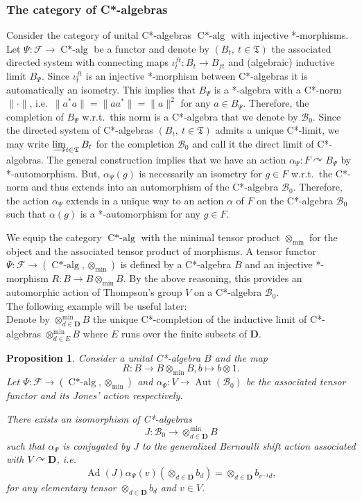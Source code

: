 \documentclass[a4paper,12pt]{amsart}
\numberwithin{equation}{section}
\newtheorem{proposition}[theo]{Proposition}
\theoremstyle{definition}
\newcommand{\act}{\curvearrowright}
\newcommand{\al}{\alpha}
\DeclareMathOperator{\Ad}{Ad}
\DeclareMathOperator{\Aut}{Aut}
\newcommand{\scrB}{\mathscr B}
\DeclareMathOperator{\Calg}{C*-alg}
\newcommand{\D}{\mathbf D}
\newcommand{\cF}{\mathcal F}
\newcommand{\ot}{\otimes}\newcommand{\otmin}{\otimes_{\text{min}}}
\newcommand{\fT}{\mathfrak T}
\begin{document}
\subsubsection{The category of C*-algebras}
Consider the category of unital C*-algebras $\Calg$ with injective *-morphisms.
Let $\Psi:\cF\to \Calg$ be a functor and denote by $(B_t ,\ t\in\fT)$ the associated directed system with connecting maps $\iota_t^{ft}:B_t\to B_{ft}$ and (algebraic) inductive limit $B_\Psi$.
Since $\iota_t^{ft}$ is an injective *-morphism between C*-algebras it is automatically an isometry.
This implies that $B_\Psi$ is a *-algebra with a C*-norm $\| \cdot \|$, i.e.~$\| a^*a \| = \| aa^*\| = \|a\|^2$ for any $a\in B_\Psi$.
Therefore, the completion of $B_\Psi$ w.r.t.~this norm is a C*-algebra that we denote by $\mathscr B_0.$
Since the directed system of C*-algebras $(B_t,\ t\in\fT)$ admits a unique C*-limit, we may write $\varinjlim_{t\in\fT} B_t$ for the completion $\scrB_0$ and call it the direct limit of C*-algebras.
The general construction implies that we have an action $\al_\Psi:F\act B_\Psi$ by *-automorphism.
But, $\al_\Psi(g)$ is necessarily an isometry for $g\in F$ w.r.t.~the C*-norm and thus extends into an automorphism of the C*-algebra $\scrB_0.$
Therefore, the action $\al_\Psi$ extends in a unique way to an action $\al$ of $F$ on the C*-algebra $\mathscr B_0$ such that $\al(g)$ is a *-automorphism for any $g\in F$.

We equip the category $\Calg$ with the minimal tensor product $\ot_{\min}$ for the object and the associated tensor product of morphisms.  
A tensor functor $\Psi:\cF\to (\Calg,\ot_{\min})$ is defined by a C*-algebra $B$ and an injective *-morphism $R: B\to B\ot_{\min} B.$
By the above reasoning, this provides an automorphic action of Thompson's group $V$ on a C*-algebra $\scrB_0.$\\[0.25cm]
The following example will be useful later:\\[0.1cm]
Denote by $\otimes_{d\in\D}^{\min} B$ the unique C*-completion of the inductive limit of C*-algebras $\ot_{d\in E}^{\min} B$ where $E$ runs over the finite subsets of $\D$.

\begin{proposition}\label{prop:TensorProd}
Consider a unital C*-algebra $B$ and the map $$R:B\to B\ot_{\min} B, b\mapsto b\ot 1.$$
Let $\Psi:\cF\to (\Calg,\ot_{\min})$ and $\alpha_\Psi:V\to \Aut(\mathscr B_0)$ be the associated tensor functor and its Jones' action respectively.

There exists an isomorphism of C*-algebras 
$$J:\mathscr B_0 \to \otimes_{d\in\D}^{\min} B$$
such that $\al_\Psi$ is conjugated by $J$ to the generalized Bernoulli shift action associated with $V\act \D$, i.e.
$$\Ad(J) \alpha_\Psi(v) (\ot_{d\in\D} b_d) = \ot_{d\in\D} b_{v^{-1}d},$$
for any elementary tensor $\ot_{d\in\D} b_d$ and $v\in V$.
\end{proposition}
\end{document}
